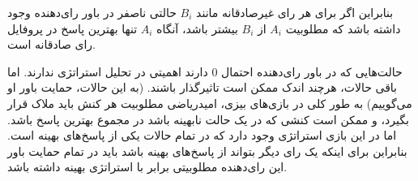 \documentclass[12pt]{article}
\begin{document}
\begin{enumerate}
{        بنابراین اگر برای هر  رای غیرصادقانه مانند $B_i$
         حالتی ناصفر در باور رای‌دهنده وجود
        داشته باشد که مطلوبیت
        $A_{i}$
        از
        $B_i$
        بیشتر باشد، 
        آنگاه $A_i$ 
        تنها بهترین پاسخ در پروفایل رای صادقانه است.

        حالت‌هایی که در باور رای‌دهنده احتمال $0$
        دارند اهمیتی در تحلیل استراتژی ندارند. اما باقی حالات، هرچند اندک
        ممکن است تاثیرگذار باشند. (به این حالات، حمایت باور او می‌گوییم)
        ‌به طور کلی در بازی‌های بیزی،
         امیدریاضی مطلوبیت هر کنش باید ملاک قرار بگیرد، و ممکن است کنشی
         که در یک حالت نابهینه باشد در مجموع بهترین پاسخ باشد.
         اما در این بازی
        استراتژی وجود دارد که در تمام حالات یکی از پاسخ‌های بهینه است. بنابراین برای اینکه
        یک رای دیگر بتواند از پاسخ‌های بهینه باشد باید در تمام حمایت باور این رای‌دهنده
        مطلوبیتی برابر با استراتژی بهینه داشته باشد.
    }
\end{enumerate}

\newpage
\end{document}
